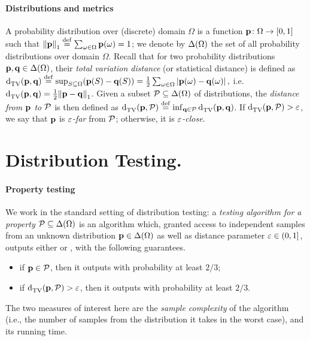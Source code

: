 \paragraph{Distributions and metrics} 
A probability distribution over (discrete) domain $\Omega$ is a function $\mathbf{p}\colon\Omega\to[0,1]$ such that ${\lVert\mathbf{p}{\rVert}}_1\stackrel{\rm def}{=} \sum_{\omega\in\Omega}\mathbf{p}(\omega)=1$; we denote by $\Delta\!\left(\Omega\right)$ the set of all probability distributions over domain $\Omega$. 
Recall that for two probability distributions $\mathbf{p},\mathbf{q}\in\Delta\!\left(\Omega\right)$, their \emph{total variation distance} (or statistical distance) is defined as 
$
     {\operatorname{d}_{\textrm{TV}}^{}\!\left({\mathbf{p}, \mathbf{q}}\right)} \stackrel{\rm def}{=} \sup_{S\subseteq\Omega} (\mathbf{p}(S)-\mathbf{q}(S)) = \frac{1}{2}\sum_{\omega\in\Omega} \left\lvert \mathbf{p}(\omega)-\mathbf{q}(\omega) \right\rvert,
$
i.e. $ {\operatorname{d}_{\textrm{TV}}^{}\!\left({\mathbf{p}, \mathbf{q}}\right)} = \frac{1}{2}{\lVert\mathbf{p}-\mathbf{q}{\rVert}}_1$. Given a subset $\mathcal{P}\subseteq \Delta\!\left(\Omega\right)$ of distributions, the \emph{distance from $\mathbf{p}$ to $\mathcal{P}$} is then defined as $ {\operatorname{d}_{\textrm{TV}}^{}\!\left({\mathbf{p}, \mathcal{P}}\right)}\stackrel{\rm def}{=} \inf_{\mathbf{q}\in\mathcal{P}}  {\operatorname{d}_{\textrm{TV}}^{}\!\left({\mathbf{p}, \mathbf{q}}\right)}$. If $ {\operatorname{d}_{\textrm{TV}}^{}\!\left({\mathbf{p}, \mathcal{P}}\right)} > \varepsilon$, we say that $\mathbf{p}$ is \emph{$\varepsilon$-far} from $\mathcal{P}$; otherwise, it is \emph{$\varepsilon$-close}.


\section{Distribution Testing.} 

\paragraph{Property testing}
We work in the standard setting of distribution testing: a \emph{testing algorithm for a property $\mathcal{P}\subseteq\Delta\!\left(\Omega\right)$} is an algorithm which, granted access to independent samples from an unknown distribution $\mathbf{p}\in\Delta\!\left(\Omega\right)$ as well as distance parameter $\varepsilon\in(0,1]$, outputs either \accept or \reject, with the following guarantees.
\begin{itemize}
  \item if $\mathbf{p}\in\mathcal{P}$, then it outputs \accept with probability at least $2/3$;
  \item if $ {\operatorname{d}_{\textrm{TV}}^{}\!\left({\mathbf{p}, \mathcal{P}}\right)}>\varepsilon$, then it outputs \reject with probability at least $2/3$.
\end{itemize}
The two measures of interest here are the \emph{sample complexity} of the algorithm (i.e., the number of samples from the distribution it takes in the worst case), and its running time.

